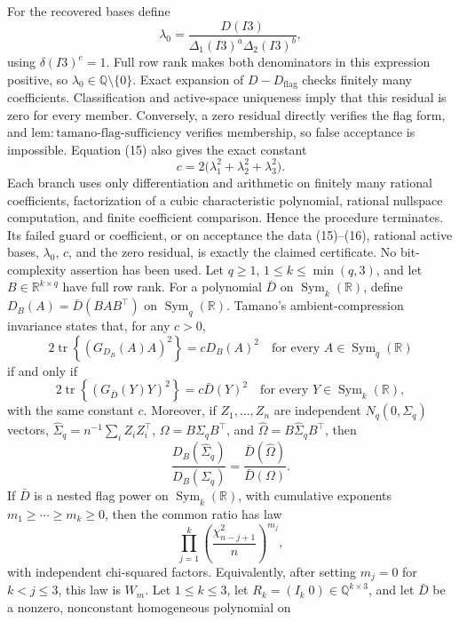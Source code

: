 For the recovered bases define
\[
 \lambda_0
 =\frac{D(I3)}{\Delta_1(I3)^a\Delta_2(I3)^b},
\]
using \(\delta(I3)^e=1\).  Full row rank makes both denominators in
this expression positive, so \(\lambda_0\in\mathbb Q\setminus\{0\}\).
Exact expansion of \(D-D_{\mathrm{flag}}\) checks finitely many
coefficients.  Classification and active-space uniqueness imply that
this residual is zero for every member.  Conversely, a zero residual
directly verifies the flag form, and
\(\mathrm{lem{:}tamano\text{-}flag\text{-}sufficiency}\) verifies
membership, so false acceptance is impossible.  Equation (15) also
gives the exact constant
\[
 c=2\bigl(\lambda_1^2+\lambda_2^2+\lambda_3^2\bigr).
\]
Each branch uses only differentiation and arithmetic on finitely many
rational coefficients, factorization of a cubic characteristic
polynomial, rational nullspace computation, and finite coefficient
comparison.  Hence the procedure terminates.  Its failed guard or
coefficient, or on acceptance the data (15)--(16), rational active
bases, \(\lambda_0\), \(c\), and the zero residual, is exactly the
claimed certificate.  No bit-complexity assertion has been used.
Let \(q\geq1\), \(1\leq k\leq\min(q,3)\), and let
\(B\in\mathbb R^{k\times q}\) have full row rank.  For a polynomial
\(\bar D\) on \(\operatorname{Sym}_k(\mathbb R)\), define
\(D_B(A)=\bar D(BAB^{\top})\) on
\(\operatorname{Sym}_q(\mathbb R)\).  Tamano's ambient-compression
invariance states that, for any \(c>0\),
\[
 2\operatorname{tr}\!\left\{(G_{D_B}(A)A)^2\right\}=cD_B(A)^2
 \quad\text{for every }A\in\operatorname{Sym}_q(\mathbb R)
\]
if and only if
\[
 2\operatorname{tr}\!\left\{(G_{\bar D}(Y)Y)^2\right\}=c\bar D(Y)^2
 \quad\text{for every }Y\in\operatorname{Sym}_k(\mathbb R),
\]
with the same constant \(c\).  Moreover, if
\(Z_1,\ldots,Z_n\) are independent \(N_q(0,\Sigma_q)\) vectors,
\(\widehat\Sigma_q=n^{-1}\sum_i Z_iZ_i^{\top}\),
\(\Omega=B\Sigma_qB^{\top}\), and
\(\widehat\Omega=B\widehat\Sigma_qB^{\top}\), then
\[
 \frac{D_B(\widehat\Sigma_q)}{D_B(\Sigma_q)}
 =\frac{\bar D(\widehat\Omega)}{\bar D(\Omega)}.
\]
If \(\bar D\) is a nested flag power on
\(\operatorname{Sym}_k(\mathbb R)\), with cumulative exponents
\(m_1\geq\cdots\geq m_k\geq0\), then the common ratio has law
\[
 \prod_{j=1}^{k}
 \left(\frac{\chi^2_{n-j+1}}{n}\right)^{m_j},
\]
with independent chi-squared factors.  Equivalently, after setting
\(m_j=0\) for \(k<j\leq3\), this law is \(W_m\).
Let \(1\leq k\leq3\), let
\(R_k=(I_k\;0)\in\mathbb Q^{k\times3}\), and let \(\bar D\) be a
nonzero, nonconstant homogeneous polynomial on
